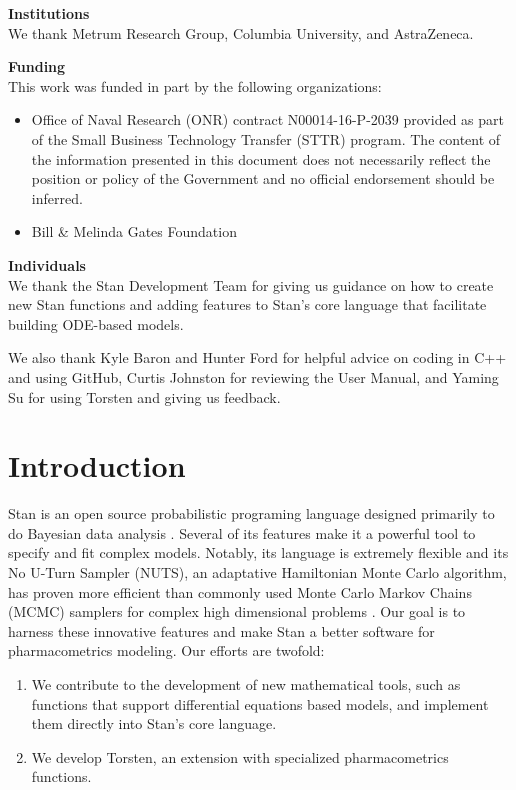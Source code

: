 \documentclass[11pt]{amsart}
\begin{document}
{\bf Institutions} \ \\
We thank Metrum Research Group, Columbia University, and AstraZeneca.

{\bf Funding}  \ \\
This work was funded in part by the following organizations:
\begin{itemize}
  \item Office of Naval Research (ONR) contract N00014-16-P-2039 provided as part  of the Small Business Technology Transfer (STTR) program. The content of the information presented in this document does not necessarily reflect the position or policy of the Government and no official endorsement should be inferred.
  \item Bill \& Melinda Gates Foundation
\end{itemize}

{\bf Individuals} \ \\
We thank the Stan Development Team for giving us guidance on how to create new Stan functions and adding features to Stan's core language that facilitate building ODE-based models.

We also thank Kyle Baron and Hunter Ford for helpful advice on coding in C++ and using GitHub, Curtis Johnston for reviewing the User Manual, and Yaming Su for using Torsten and giving us feedback.

\pagebreak

\section{Introduction}

Stan is an open source probabilistic programing language designed primarily to do Bayesian data analysis \cite{Stan:2016}. Several of its features make it a powerful tool to specify and fit complex models. Notably, its language is extremely flexible and its No U-Turn Sampler (NUTS), an adaptative Hamiltonian Monte Carlo algorithm, has proven more efficient than commonly used Monte Carlo Markov Chains (MCMC) samplers for complex high dimensional problems \cite{HoffmanGelman:2014}. Our goal is to harness these innovative features and make Stan a better software for pharmacometrics modeling. Our efforts are twofold:
\begin{enumerate}
  \item We contribute to the development of new mathematical tools, such as functions that support differential equations based models, and implement them directly into Stan's core language.
  \item We develop Torsten, an extension with specialized pharmacometrics functions.
\end{enumerate}
\end{document}

